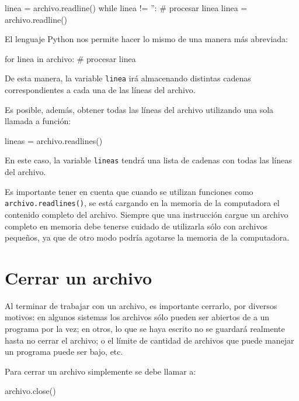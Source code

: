 \begin{codigo-python-sn}
linea = archivo.readline()
while linea != '':
    # procesar linea
    linea = archivo.readline()
\end{codigo-python-sn}

El lenguaje Python nos permite hacer lo mismo de una manera más abreviada:

\begin{codigo-python-sn}
for linea in archivo:
    # procesar linea
\end{codigo-python-sn}

De esta manera, la variable \lstinline!linea! irá almacenando distintas cadenas
correspondientes a cada una de las líneas del archivo.

Es posible, además, obtener todas las líneas del archivo utilizando una
sola llamada a función:

\begin{codigo-python-sn}
lineas = archivo.readlines()
\end{codigo-python-sn}

En este caso, la variable \lstinline!lineas! tendrá una lista de cadenas con
todas las líneas del archivo.

\begin{atencion}
Es importante tener en cuenta que cuando se utilizan funciones como
\lstinline!archivo.readlines()!, se está cargando en la memoria de la computadora
el contenido completo del archivo.  Siempre que una instrucción cargue un archivo
completo en memoria debe tenerse cuidado de utilizarla sólo con archivos
pequeños, ya que de otro modo podría agotarse la memoria de la computadora.
\end{atencion}

\section{Cerrar un archivo}

Al terminar de trabajar con un archivo, es importante cerrarlo,
por diversos motivos: en algunos sistemas los archivos sólo pueden
ser abiertos de a un programa por la vez; en otros, lo que se haya
escrito no se guardará realmente hasta no cerrar el archivo; o el
límite de cantidad de archivos que puede manejar un programa puede
ser bajo, etc.

Para cerrar un archivo simplemente se debe llamar a:

\begin{codigo-python-sn}
archivo.close()
\end{codigo-python-sn}

